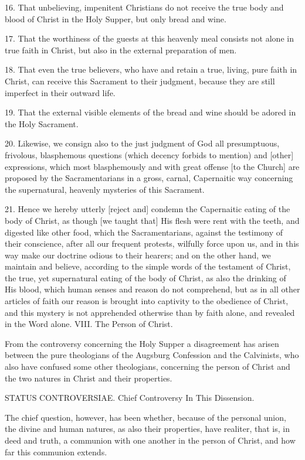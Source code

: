 16. That unbelieving, impenitent Christians do not receive the true body and blood of Christ in the Holy Supper, but only bread and wine.

17. That the worthiness of the guests at this heavenly meal consists not alone in true faith in Christ, but also in the external preparation of men.

18. That even the true believers, who have and retain a true, living, pure faith in Christ, can receive this Sacrament to their judgment, because they are still imperfect in their outward life.

19. That the external visible elements of the bread and wine should be adored in the Holy Sacrament.

20. Likewise, we consign also to the just judgment of God all presumptuous, frivolous, blasphemous questions (which decency forbids to mention) and [other] expressions, which most blasphemously and with great offense [to the Church] are proposed by the Sacramentarians in a gross, carnal, Capernaitic way concerning the supernatural, heavenly mysteries of this Sacrament.

21. Hence we hereby utterly [reject and] condemn the Capernaitic eating of the body of Christ, as though [we taught that] His flesh were rent with the teeth, and digested like other food, which the Sacramentarians, against the testimony of their conscience, after all our frequent protests, wilfully force upon us, and in this way make our doctrine odious to their hearers; and on the other hand, we maintain and believe, according to the simple words of the testament of Christ, the true, yet supernatural eating of the body of Christ, as also the drinking of His blood, which human senses and reason do not comprehend, but as in all other articles of faith our reason is brought into captivity to the obedience of Christ, and this mystery is not apprehended otherwise than by faith alone, and revealed in the Word alone.
VIII. The Person of Christ.

From the controversy concerning the Holy Supper a disagreement has arisen between the pure theologians of the Augsburg Confession and the Calvinists, who also have confused some other theologians, concerning the person of Christ and the two natures in Christ and their properties.

STATUS CONTROVERSIAE.
Chief Controversy In This Dissension.

The chief question, however, has been whether, because of the personal union, the divine and human natures, as also their properties, have realiter, that is, in deed and truth, a communion with one another in the person of Christ, and how far this communion extends.


